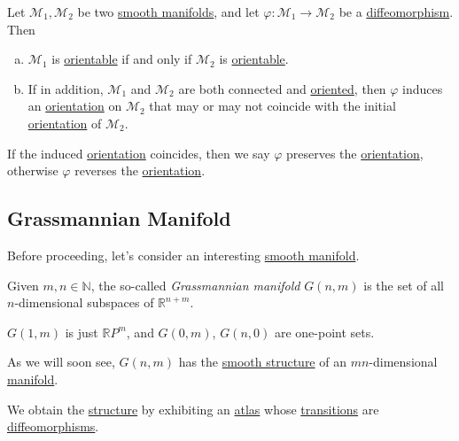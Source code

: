 Let \(\mathcal{M} _1, \mathcal{M} _2\) be two \hyperref[def:smooth-manifold]{smooth manifolds}, and let \(\varphi \colon \mathcal{M} _1 \to \mathcal{M} _2\) be a \hyperref[def:diffeomorphism]{diffeomorphism}. Then
\begin{enumerate}[(a)]
	\item \(\mathcal{M} _1\) is \hyperref[def:orientable]{orientable} if and only if \(\mathcal{M} _2\) is \hyperref[def:orientable]{orientable}.
	\item If in addition, \(\mathcal{M} _1\) and \(\mathcal{M} _2\) are both connected and \hyperref[def:oriented]{oriented}, then \(\varphi \) induces an \hyperref[def:orientation]{orientation} on \(\mathcal{M} _2\) that may or may not coincide with the initial \hyperref[def:orientation]{orientation} of \(\mathcal{M} _2\).
\end{enumerate}

If the induced \hyperref[def:orientation]{orientation} coincides, then we say \(\varphi \) preserves the \hyperref[def:orientation]{orientation}, otherwise \(\varphi \) reverses the \hyperref[def:orientation]{orientation}.

\subsection{Grassmannian Manifold}
Before proceeding, let's consider an interesting \hyperref[def:smooth-manifold]{smooth manifold}.

\begin{definition}\label{def:Grassmannian-manifold}
	Given \(m, n\in \mathbb{N} \), the so-called \emph{Grassmannian manifold} \(G(n, m)\) is the set of all \(n\)-dimensional subspaces of \(\mathbb{R} ^{n+m}\).
\end{definition}

\begin{note}
	\(G(1, m)\) is just \(\mathbb{R} P^m\), and \(G(0, m)\), \(G(n, 0)\) are one-point sets.
\end{note}

As we will soon see, \(G(n, m)\) has the \hyperref[def:smooth-structure]{smooth structure} of an \(mn\)-dimensional \hyperref[def:smooth-manifold]{manifold}.

\begin{intuition}
	We obtain the \hyperref[def:smooth-structure]{structure} by exhibiting an \hyperref[def:atlas]{atlas} whose \hyperref[def:coordinate-transition]{transitions} are \hyperref[def:diffeomorphism]{diffeomorphisms}.
\end{intuition}

